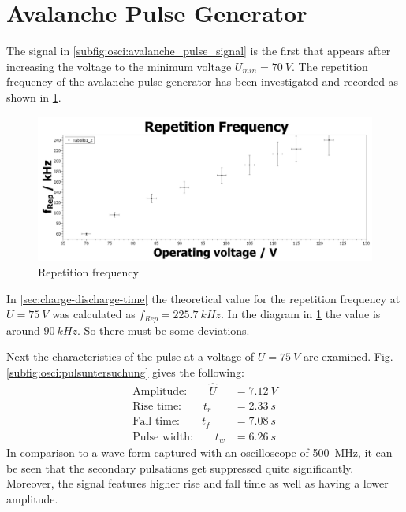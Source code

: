 \section{Avalanche Pulse Generator}
    The signal in \cref{subfig:osci:avalanche_pulse_signal} is the first that appears after increasing the voltage to the minimum
    voltage $ U_{min}=\SI{70}{V} $. The repetition frequency of the avalanche pulse generator has been investigated and
    recorded as shown in \cref{fig:repetition-frequency}.
    \begin{figure}[H]
        \centering
        \includegraphics[width=1\linewidth]{messdaten/Repetition Frequency.jpg}
        \caption[Repetition frequency]{Repetition frequency}
        \label{fig:repetition-frequency}
    \end{figure}
    In \cref{sec:charge-discharge-time} the theoretical value for the repetition frequency at $ U=\SI{75}{V} $ was
    calculated as $ f_{Rep}=\SI{225.7}{kHz} $. In the diagram in \cref{fig:repetition-frequency} the value is around
    $ \SI{90}{kHz} $. So there must be some deviations.\par\medskip
    Next the characteristics of the pulse at a voltage of $ U=\SI{75}{V} $ are examined. Fig. \cref{subfig:osci:pulsuntersuchung}
    gives the following:
    \begin{align}
        \text{Amplitude:}\qquad \hat{U}&=\SI{7.12}{V}\\
        \text{Rise time:}\qquad t_r&=\SI{2.33}{s}\\
        \text{Fall time:}\qquad t_f&=\SI{7.08}{s}\\
        \text{Pulse width:}\qquad t_w&=\SI{6.26}{s}
    \end{align}
    In comparison to a wave form captured with an oscilloscope of \SI{500}{MHz}, it can be seen that the secondary pulsations get suppressed
    quite significantly. Moreover, the signal features higher rise and fall time as well as having a lower amplitude.
